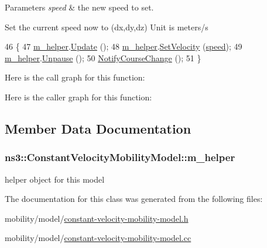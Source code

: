 \begin{DoxyParams}{Parameters}
{\em speed} & the new speed to set.\\
\hline
\end{DoxyParams}
Set the current speed now to (dx,dy,dz) Unit is meters/s 
\begin{DoxyCode}
46 \{
47   \hyperlink{classns3_1_1ConstantVelocityMobilityModel_a8743924c0254bfe69cd7a1d963d30f62}{m\_helper}.\hyperlink{classns3_1_1ConstantVelocityHelper_aaec113a6c2bae2bf8834bfb1e88d6192}{Update} ();
48   \hyperlink{classns3_1_1ConstantVelocityMobilityModel_a8743924c0254bfe69cd7a1d963d30f62}{m\_helper}.\hyperlink{classns3_1_1ConstantVelocityHelper_a985ce86c5b3c94c43048f8db314bbb51}{SetVelocity} (\hyperlink{mmwave-amc-test_8cc_a6dc6e6f3c75c509ce943163afb5dade7}{speed});
49   \hyperlink{classns3_1_1ConstantVelocityMobilityModel_a8743924c0254bfe69cd7a1d963d30f62}{m\_helper}.\hyperlink{classns3_1_1ConstantVelocityHelper_a053e3968696019359f50d2b2739f783a}{Unpause} ();
50   \hyperlink{classns3_1_1MobilityModel_add1317917ac801284c2467a68f09fbe5}{NotifyCourseChange} ();
51 \}
\end{DoxyCode}


Here is the call graph for this function\+:




Here is the caller graph for this function\+:




\subsection{Member Data Documentation}
\subsubsection[{\texorpdfstring{m\+\_\+helper}{m_helper}}]{ ns3\+::\+Constant\+Velocity\+Mobility\+Model\+::m\+\_\+helper\hspace{0.3cm}{\ttfamily [private]}}\hypertarget{classns3_1_1ConstantVelocityMobilityModel_a8743924c0254bfe69cd7a1d963d30f62}{}\label{classns3_1_1ConstantVelocityMobilityModel_a8743924c0254bfe69cd7a1d963d30f62}


helper object for this model 



The documentation for this class was generated from the following files\+:\begin{DoxyCompactItemize}
\item 
mobility/model/\hyperlink{constant-velocity-mobility-model_8h}{constant-\/velocity-\/mobility-\/model.\+h}\item 
mobility/model/\hyperlink{constant-velocity-mobility-model_8cc}{constant-\/velocity-\/mobility-\/model.\+cc}\end{DoxyCompactItemize}
